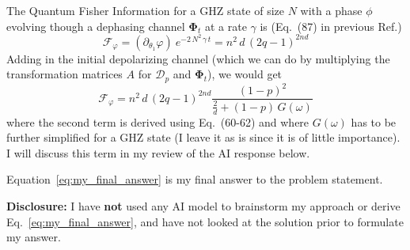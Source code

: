 {\begin{enumerate}
  The Quantum Fisher Information for a GHZ state of size $N$ with a phase $\phi$ evolving though a dephasing channel $\mathbf{\Phi}_t$ at a rate $\gamma$ is (Eq.~(87) in previous Ref.) 
  $$
    \mathcal{F}_\varphi = (\partial_{\theta_1}\varphi) \ e^{-2\,N^2\,\gamma\,t} = n^2\,d\,(2q-1)^{2nd}
  $$
  Adding in the initial depolarizing channel (which we can do by multiplying the transformation matrices $A$ for $\mathcal{D}_p$ and $\mathbf{\Phi}_t$), we would get
  \begin{equation} \label{eq:my_final_answer}
    \mathcal{F}_\varphi = n^2\,d\,(2q-1)^{2nd}\frac{(1-p)^2}{\frac{2}{d} + (1-p)\,G(\omega)}  
  \end{equation}
  where the second term is derived using  Eq.~(60-62) and where $G(\omega)$ has to be further simplified for a GHZ state (I leave it as is since it is of little importance). I will discuss this term in my review of the AI response below.

  Equation~\eqref{eq:my_final_answer} is my final answer to the problem statement.

\end{enumerate}

\textbf{Disclosure:} I have \textbf{not} used any AI model to brainstorm my approach or derive Eq.~\eqref{eq:my_final_answer}, and have not looked at the solution prior to formulate my answer. 


}